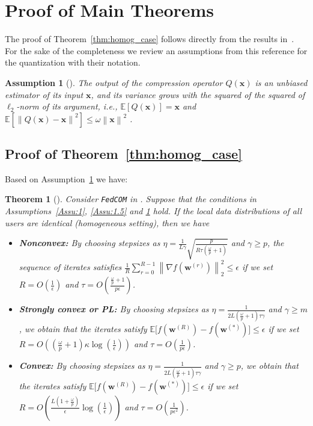 \documentclass[twoside]{article}
\newtheorem{theorem}{Theorem}
\newtheorem{assumption}{Assumption}
\begin{document}
\newpage




\newpage
\section{Proof of Main Theorems}
The proof of Theorem~\ref{thm:homog_case} follows directly from the results in~\cite{haddadpour2020federated}. For the sake of the completeness we review an assumptions from this reference for the quantization with their notation.

\begin{assumption}[\cite{haddadpour2020federated}]\label{Assu:quant}
The output of the compression operator $Q(\mathbf{x})$ is an unbiased estimator of its input $\mathbf{x}$, and its variance grows with the squared of the squared of $\ell_2$-norm of its argument, i.e., $\mathbb{E}\left[Q(\mathbf{x})\right]=\mathbf{x}$ and $\mathbb{E}\left[\left\|Q(\mathbf{x})-\mathbf{x}\right\|^2\right]\leq \omega\left\|\mathbf{x}\right\|^2$ .
\end{assumption}


\subsection{Proof of Theorem~\ref{thm:homog_case}}
Based on Assumption~\ref{Assu:quant} we have:
\begin{theorem}[\cite{haddadpour2020federated}]\label{thm:fromhaddad}
 Consider \texttt{FedCOM} in \cite{haddadpour2020federated}. Suppose that the conditions in Assumptions~\ref{Assu:1}, \ref{Assu:1.5} and \ref{Assu:quant} hold. If the local data distributions of all users are identical (homogeneous setting), then we have  
 \begin{itemize}
     \item \textbf{Nonconvex:}  By choosing stepsizes as $\eta=\frac{1}{L\gamma}\sqrt{\frac{p}{R\tau\left(\frac{\omega}{p}+1\right)}}$ and $\gamma\geq p$, the sequence of iterates satisfies  $\frac{1}{R}\sum_{r=0}^{R-1}\left\|\nabla f({\boldsymbol{w}}^{(r)})\right\|_2^2\leq {\epsilon}$ if we set
     $R=O\left(\frac{1}{\epsilon}\right)$ and $ \tau=O\left(\frac{\frac{\omega}{p}+1}{{p}\epsilon}\right)$.
     \item \textbf{Strongly convex or PL:}
      By choosing stepsizes as $\eta=\frac{1}{2L\left(\frac{\omega}{p}+1\right)\tau\gamma}$ and $\gamma\geq m$, we obtain that the iterates satisfy $\mathbb{E}\Big[f({\boldsymbol{w}}^{(R)})-f({\boldsymbol{w}}^{(*)})\Big]\leq \epsilon$ if  we set
     $R=O\left(\left(\frac{\omega}{p}+1\right)\kappa\log\left(\frac{1}{\epsilon}\right)\right)$ and $ \tau=O\left(\frac{1}{p\epsilon}\right)$.
     \item \textbf{Convex:} By choosing stepsizes as $\eta=\frac{1}{2L\left(\frac{\omega}{p}+1\right)\tau\gamma}$ and $\gamma\geq p$, we obtain that the iterates satisfy $ \mathbb{E}\Big[f({\boldsymbol{w}}^{(R)})-f({\boldsymbol{w}}^{(*)})\Big]\leq \epsilon$ if we set
     $R=O\left(\frac{L\left(1+\frac{\omega}{p}\right)}{\epsilon}\log\left(\frac{1}{\epsilon}\right)\right)$ and $ \tau=O\left(\frac{1}{p\epsilon^2}\right)$.
 \end{itemize}
\end{theorem}
\end{document}
